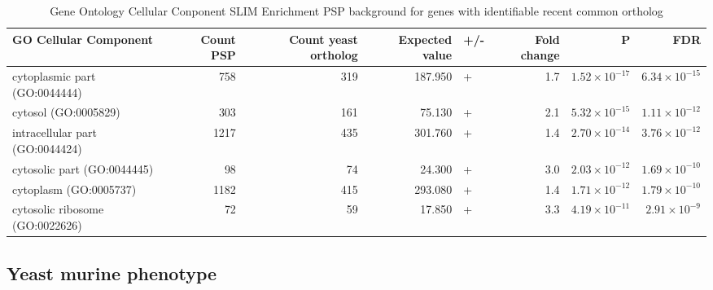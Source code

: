 \begin{table}[ht]
\centering
\begin{adjustbox}{width=1\textwidth}
\begin{tabular}{lrrrlrrr}
  \hline
GO Cellular Component & Count PSP & Count yeast ortholog & Expected value & +/- & Fold change & P & FDR \\ 
  \hline
cytoplasmic part (GO:0044444) & 758 & 319 & 187.950 & + & 1.7 & $1.52 \times 10^{-17}$ & $6.34 \times 10^{-15}$ \\ 
  cytosol (GO:0005829) & 303 & 161 & 75.130 & + & 2.1 & $5.32 \times 10^{-15}$ & $1.11 \times 10^{-12}$ \\ 
  intracellular part (GO:0044424) & 1217 & 435 & 301.760 & + & 1.4 & $2.70 \times 10^{-14}$ & $3.76 \times 10^{-12}$ \\ 
  cytosolic part (GO:0044445) & 98 & 74 & 24.300 & + & 3.0 & $2.03 \times 10^{-12}$ & $1.69 \times 10^{-10}$ \\ 
  cytoplasm (GO:0005737) & 1182 & 415 & 293.080 & + & 1.4 & $1.71 \times 10^{-12}$ & $1.79 \times 10^{-10}$ \\ 
  cytosolic ribosome (GO:0022626) & 72 & 59 & 17.850 & + & 3.3 & $4.19 \times 10^{-11}$ & $2.91 \times 10^{-9}$ \\ 
   \hline
\end{tabular}
\end{adjustbox}
\caption{Gene Ontology Cellular Conponent SLIM Enrichment PSP background for genes with identifiable recent common ortholog} 
\label{Table:Gene Ontology Cellular Conponent SLIM Enrichment PSP background for genes with identifiable recent common ortholog}
\end{table}

\subsection{Yeast murine phenotype}

